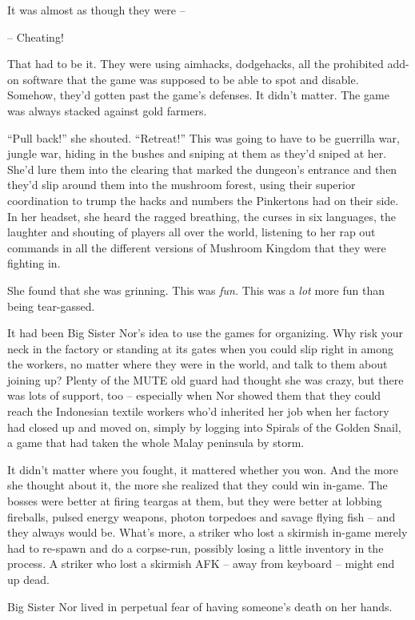 It was almost as though they were --

-- Cheating!

That had to be it. They were using aimhacks, dodgehacks, all the
prohibited add-on software that the game was supposed to be able to
spot and disable. Somehow, they'd gotten past the game's defenses.
It didn't matter. The game was always stacked against gold
farmers.

``Pull back!'' she shouted. ``Retreat!'' This was going to have to be
guerrilla war, jungle war, hiding in the bushes and sniping at them
as they'd sniped at her. She'd lure them into the clearing that
marked the dungeon's entrance and then they'd slip around them into
the mushroom forest, using their superior coordination to trump the
hacks and numbers the Pinkertons had on their side. In her headset,
she heard the ragged breathing, the curses in six languages, the
laughter and shouting of players all over the world, listening to
her rap out commands in all the different versions of Mushroom
Kingdom that they were fighting in.

She found that she was grinning. This was \emph{fun.} This was a
\emph{lot} more fun than being tear-gassed.

It had been Big Sister Nor's idea to use the games for organizing.
Why risk your neck in the factory or standing at its gates when you
could slip right in among the workers, no matter where they were in
the world, and talk to them about joining up? Plenty of the MUTE
old guard had thought she was crazy, but there was lots of support,
too -- especially when Nor showed them that they could reach the
Indonesian textile workers who'd inherited her job when her factory
had closed up and moved on, simply by logging into Spirals of the
Golden Snail, a game that had taken the whole Malay peninsula by
storm.

It didn't matter where you fought, it mattered whether you won. And
the more she thought about it, the more she realized that they
could win in-game. The bosses were better at firing teargas at
them, but they were better at lobbing fireballs, pulsed energy
weapons, photon torpedoes and savage flying fish -- and they always
would be. What's more, a striker who lost a skirmish in-game merely
had to re-spawn and do a corpse-run, possibly losing a little
inventory in the process. A striker who lost a skirmish AFK -- away
from keyboard -- might end up dead.

Big Sister Nor lived in perpetual fear of having someone's death on
her hands.

